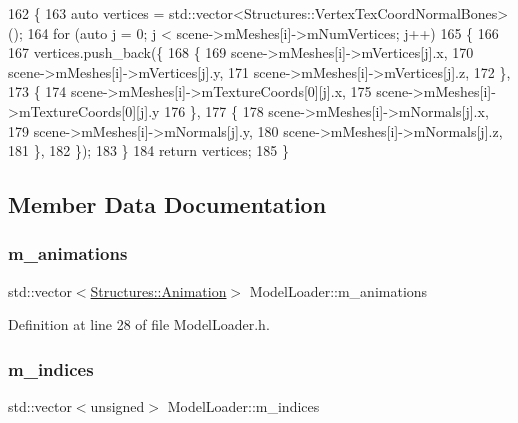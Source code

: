 \begin{DoxyCode}
162 \{
163     \textcolor{keyword}{auto} vertices = std::vector<Structures::VertexTexCoordNormalBones>();
164     \textcolor{keywordflow}{for} (\textcolor{keyword}{auto} j = 0; j < scene->mMeshes[i]->mNumVertices; j++)
165     \{
166 
167         vertices.push\_back(\{
168             \{
169                 scene->mMeshes[i]->mVertices[j].x,
170                 scene->mMeshes[i]->mVertices[j].y,
171                 scene->mMeshes[i]->mVertices[j].z,
172             \},
173                 \{
174                     scene->mMeshes[i]->mTextureCoords[0][j].x,
175                     scene->mMeshes[i]->mTextureCoords[0][j].y
176                 \},
177                 \{
178                     scene->mMeshes[i]->mNormals[j].x,
179                     scene->mMeshes[i]->mNormals[j].y,
180                     scene->mMeshes[i]->mNormals[j].z,
181                 \},
182             \});
183     \}
184     \textcolor{keywordflow}{return} vertices;
185 \}
\end{DoxyCode}


\subsection{Member Data Documentation}
\mbox{\label{class_model_loader_a2b9cf4d8fe3432ddc656651057c78860}} 
\subsubsection{\texorpdfstring{m\+\_\+animations}{m\_animations}}
{\footnotesize\ttfamily std\+::vector$<$\mbox{\hyperlink{struct_structures_1_1_animation}{Structures\+::\+Animation}}$>$ Model\+Loader\+::m\+\_\+animations\hspace{0.3cm}{\ttfamily [private]}}



Definition at line 28 of file Model\+Loader.\+h.

\mbox{\label{class_model_loader_a6d63371db7677b60c2c000f23c7fb8f6}} 
\subsubsection{\texorpdfstring{m\+\_\+indices}{m\_indices}}
{\footnotesize\ttfamily std\+::vector$<$unsigned$>$ Model\+Loader\+::m\+\_\+indices\hspace{0.3cm}{\ttfamily [private]}}



